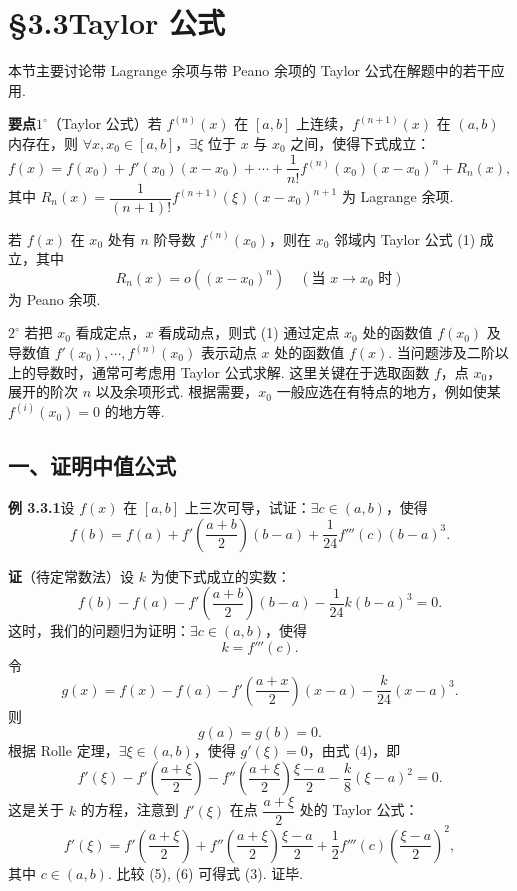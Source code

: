 \documentclass[UTF8, 12pt, fontset=fandol, oneside]{ctexart}
\begin{document}
\section*{§3.3\quad Taylor 公式}

本节主要讨论带 Lagrange 余项与带 Peano 余项的 Taylor 公式在解题中的若干应用.

\noindent\textbf{要点}\quad $1^\circ$（Taylor 公式）若 $f^{(n)}(x)$ 在 $[a,b]$ 上连续，$f^{(n+1)}(x)$ 在 $(a,b)$ 内存在，则 $\forall x,x_0\in[a,b]$，$\exists \xi$ 位于 $x$ 与 $x_0$ 之间，使得下式成立：
\begin{equation}
  f(x)=f(x_0)+f'(x_0)(x-x_0)+\cdots+\frac1{n!}f^{(n)}(x_0)(x-x_0)^n+R_n(x),
\tag{1}
\end{equation}
其中 $R_n(x)=\dfrac1{(n+1)!}f^{(n+1)}(\xi)(x-x_0)^{n+1}$ 为 Lagrange 余项.

若 $f(x)$ 在 $x_0$ 处有 $n$ 阶导数 $f^{(n)}(x_0)$，则在 $x_0$ 邻域内 Taylor 公式 (1) 成立，其中
\[
  R_n(x)=o((x-x_0)^n)\quad(\text{当 }x\to x_0\text{ 时})
\]
为 Peano 余项.

$2^\circ$ 若把 $x_0$ 看成定点，$x$ 看成动点，则式 (1) 通过定点 $x_0$ 处的函数值 $f(x_0)$ 及导数值 $f'(x_0),\cdots,f^{(n)}(x_0)$ 表示动点 $x$ 处的函数值 $f(x)$. 当问题涉及二阶以上的导数时，通常可考虑用 Taylor 公式求解. 这里关键在于选取函数 $f$，点 $x_0$，展开的阶次 $n$ 以及余项形式. 根据需要，$x_0$ 一般应选在有特点的地方，例如使某 $f^{(i)}(x_0)=0$ 的地方等.

\subsection*{一、证明中值公式}

\noindent\textbf{例 3.3.1}\quad 设 $f(x)$ 在 $[a,b]$ 上三次可导，试证：$\exists c\in(a,b)$，使得
\begin{equation}
  f(b)=f(a)+f'\left(\frac{a+b}{2}\right)(b-a)+\frac1{24}f'''(c)(b-a)^3.
\tag{1}
\end{equation}

\noindent\textbf{证}\quad （待定常数法）设 $k$ 为使下式成立的实数：
\begin{equation}
  f(b)-f(a)-f'\left(\frac{a+b}{2}\right)(b-a)-\frac1{24}k(b-a)^3=0.
\tag{2}
\end{equation}
这时，我们的问题归为证明：$\exists c\in(a,b)$，使得
\begin{equation}
  k=f'''(c).
\tag{3}
\end{equation}
令
\begin{equation}
  g(x)=f(x)-f(a)-f'\left(\frac{a+x}{2}\right)(x-a)-\frac{k}{24}(x-a)^3.
\tag{4}
\end{equation}
则
\[
  g(a)=g(b)=0.
\]
根据 Rolle 定理，$\exists \xi\in(a,b)$，使得 $g'(\xi)=0$，由式 (4)，即
\begin{equation}
  f'(\xi)-f'\left(\frac{a+\xi}{2}\right)-f''\left(\frac{a+\xi}{2}\right)\frac{\xi-a}{2}
  -\frac{k}{8}(\xi-a)^2=0.
\tag{5}
\end{equation}
这是关于 $k$ 的方程，注意到 $f'(\xi)$ 在点 $\dfrac{a+\xi}{2}$ 处的 Taylor 公式：
\[
  f'(\xi)=f'\left(\frac{a+\xi}{2}\right)
  +f''\left(\frac{a+\xi}{2}\right)\frac{\xi-a}{2}
  +\frac12f'''(c)\left(\frac{\xi-a}{2}\right)^2,
\tag{6}
\]
其中 $c\in(a,b)$. 比较 (5), (6) 可得式 (3). 证毕.
\end{document}
